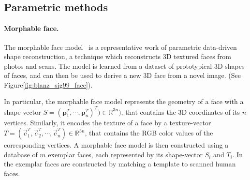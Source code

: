\subsection{Parametric methods}



\paragraph*{Morphable face.} The morphable face model~\cite{Blanz:1999:MMS} is a representative work of parametric data-driven shape reconstruction,
a technique which reconstructs 3D textured faces from photos and scans. The model is learned from a dataset of prototypical 3D shapes of faces, and can then be used to derive a new 3D face from a novel image. (See Figure\ref{fig:blanz_sig99_face}).

In particular, the morphable face model represents the geometry of a face with a shape-vector $S = (\mathbf{p}_1^{T}, \cdots, \mathbf{p}_{n}^{T})^{T}) \in \mathbb{R}^{3n})$, that contains the 3D coordinates of its $n$ vertices. Similarly, it encodes the texture of a face by a texture-vector $T = (\vec{c}_1^{T}, \vec{c}_2^{T}, \cdots, \vec{c}_{n}^{T}) \in \mathbb{R}^{3n}$, that contains the RGB color values of the corresponding vertices. A morphable face model is then constructed using a database of $m$ exemplar faces, each represented by its shape-vector $S_i$ and $T_i$. In~\cite{Blanz:1999:MMS} the exemplar faces are constructed by matching a template to scanned human faces.


